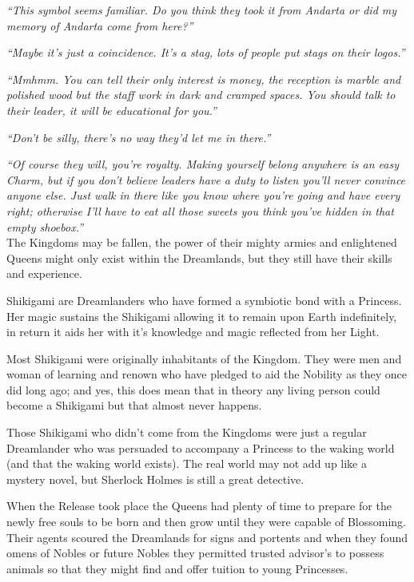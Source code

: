 \newpage{}

\noindent \textit{“This symbol seems familiar. Do you think they took it from Andarta or did my memory of Andarta come from here?”}

\textit{“Maybe it's just a coincidence. It's a stag, lots of people put stags on their logos.”}

\textit{“Mmhmm. You can tell their only interest is money, the reception is marble and polished wood but the staff work in dark and cramped spaces. You should talk to their leader, it will be educational for you.”}

\textit{“Don't be silly, there's no way they'd let me in there.”}

\textit{“Of course they will, you're royalty. Making yourself belong anywhere is an easy Charm, but if you don't believe leaders have a duty to listen you'll never convince anyone else. Just walk in there like you know where you're going and have every right; otherwise I'll have to eat all those sweets you think you've hidden in that empty shoebox.”}\\


\noindent The Kingdoms may be fallen, the power of their mighty armies and enlightened Queens might only exist within the Dreamlands, but they still have their skills and experience.

Shikigami are Dreamlanders who have formed a symbiotic bond with a Princess. Her magic sustains the Shikigami allowing it to remain upon Earth indefinitely, in return it aids her with it's knowledge and magic reflected from her Light.

Most Shikigami were originally inhabitants of the Kingdom. They were men and woman of learning and renown who have pledged to aid the Nobility as they once did long ago; and yes, this does mean that in theory any living person could become a Shikigami but that almost never happens.

Those Shikigami who didn't come from the Kingdoms were just a regular Dreamlander who was persuaded to accompany a Princess to the waking world (and that the waking world exists). The real world may not add up like a mystery novel, but Sherlock Holmes is still a great detective.

When the Release took place the Queens had plenty of time to prepare for the newly free souls to be born and then grow until they were capable of Blossoming. Their agents scoured the Dreamlands for signs and portents and when they found omens of Nobles or future Nobles they permitted trusted advisor’s to possess animals so that they might find and offer tuition to young Princesses.

